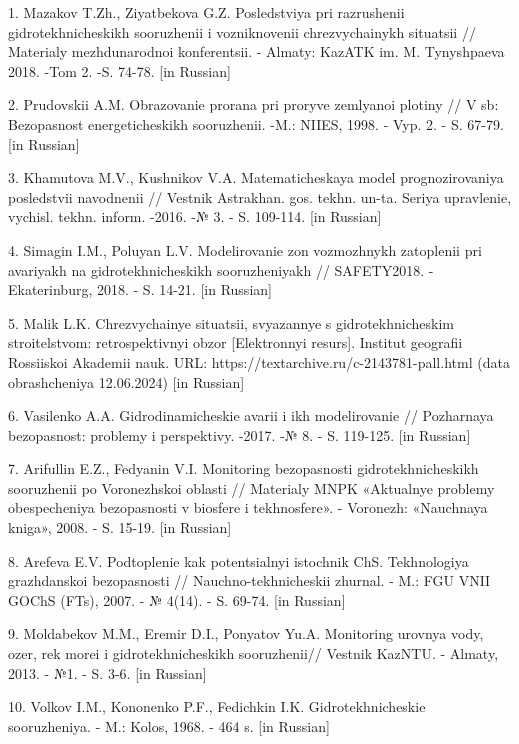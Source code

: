 \begin{noparindent}
1. Mazakov T.Zh., Ziyatbekova G.Z. Posledstviya pri razrushenii
gidrotekhnicheskikh sooruzhenii i vozniknovenii chrezvychainykh
situatsii // Materialy mezhdunarodnoi konferentsii. - Almaty: KazATK im.
M. Tynyshpaeva 2018. -Tom 2. -S. 74-78. {[}in Russian{]}

2. Prudovskii A.M. Obrazovanie prorana pri proryve zemlyanoi plotiny //
V sb: Bezopasnost\textquotesingle{} energeticheskikh sooruzhenii. -M.:
NIIES, 1998. - Vyp. 2. - S. 67-79. {[}in Russian{]}

3. Khamutova M.V., Kushnikov V.A. Matematicheskaya
model\textquotesingle{} prognozirovaniya posledstvii navodnenii //
Vestnik Astrakhan. gos. tekhn. un-ta. Seriya upravlenie, vychisl. tekhn.
inform. -2016. -№ 3. - S. 109-114. {[}in Russian{]}

4. Simagin I.M., Poluyan L.V. Modelirovanie zon vozmozhnykh zatoplenii
pri avariyakh na gidrotekhnicheskikh sooruzheniyakh // SAFETY2018. -
Ekaterinburg, 2018. - S. 14-21. {[}in Russian{]}

5. Malik L.K. Chrezvychainye situatsii, svyazannye s gidrotekhnicheskim
stroitel\textquotesingle stvom: retrospektivnyi obzor {[}Elektronnyi
resurs{]}. Institut geografii Rossiiskoi Akademii nauk. URL:
https://textarchive.ru/c-2143781-pall.html (data obrashcheniya
12.06.2024) {[}in Russian{]}

6. Vasilenko A.A. Gidrodinamicheskie avarii i ikh modelirovanie //
Pozharnaya bezopasnost\textquotesingle: problemy i perspektivy. -2017.
-№ 8. - S. 119-125. {[}in Russian{]}

7. Arifullin E.Z., Fedyanin V.I. Monitoring bezopasnosti
gidrotekhnicheskikh sooruzhenii po Voronezhskoi oblasti // Materialy
MNPK «Aktual\textquotesingle nye problemy obespecheniya bezopasnosti v
biosfere i tekhnosfere». - Voronezh: «Nauchnaya kniga», 2008. - S.
15-19. {[}in Russian{]}

8. Aref\textquotesingle eva E.V. Podtoplenie kak
potentsial\textquotesingle nyi istochnik ChS. Tekhnologiya grazhdanskoi
bezopasnosti // Nauchno-tekhnicheskii zhurnal. - M.: FGU VNII GOChS
(FTs), 2007. - № 4(14). - S. 69-74. {[}in Russian{]}

9. Moldabekov M.M., Eremir D.I., Ponyatov Yu.A. Monitoring urovnya vody,
ozer, rek morei i gidrotekhnicheskikh sooruzhenii// Vestnik KazNTU. -
Almaty, 2013. - №1. - S. 3-6. {[}in Russian{]}

10. Volkov I.M., Kononenko P.F., Fedichkin I.K. Gidrotekhnicheskie
sooruzheniya. - M.: Kolos, 1968. - 464 s. {[}in Russian{]}
\end{noparindent}

